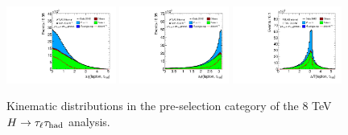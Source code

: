 \begin{figure}[tp]
  \includegraphics[width=0.32\textwidth]{figures/presel/taulep-deta}
  \includegraphics[width=0.32\textwidth]{figures/presel/taulep-dphi}
  \includegraphics[width=0.32\textwidth]{figures/presel/taulep-dR} \\
  \caption{Kinematic distributions in the pre-selection category of the 8 TeV $H\rightarrow\tau_\ell\tau_\text{had}$ analysis.}
  \label{fig:stategy-presel-1}
\end{figure}

\clearpage

